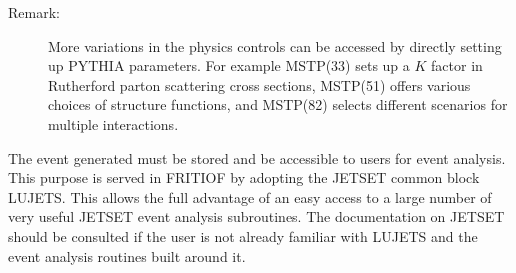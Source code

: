 \begin{itemize}
\begin{description}
\item[Remark: ] More variations in the physics controls can be accessed 
      by directly setting up PYTHIA parameters.  For example MSTP(33)
      sets up a $K$ factor in Rutherford parton scattering cross sections, 
      MSTP(51) offers various choices of structure functions, and 
      MSTP(82) selects different scenarios for multiple interactions.  
\end{description}
\end{itemize} 




The event generated must be stored and be accessible to users for event  
analysis.  This purpose is served in FRITIOF by adopting the JETSET 
common block LUJETS.  This allows the full advantage of an easy access to
a large number of very useful JETSET event analysis subroutines.  The documentation on JETSET \cite{j73} should
be consulted if the user is not already familiar with LUJETS and the
event analysis routines built around it.

